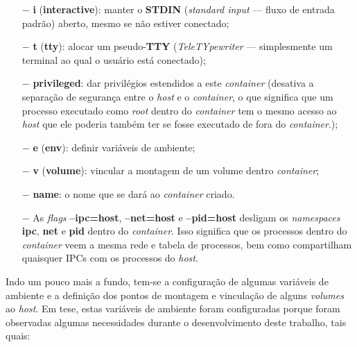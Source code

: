 \documentclass[
  12pt,				%
  openright,			%
  twoside,			%
  a4paper,			%
  english,			%
  french,				%
  spanish,			%
  brazil,				%
  ]{abntex2}
\begin{document}
\begin{itemize}
  \item[$-$] \textbf{i} (\textbf{interactive}): manter o \textbf{STDIN} (\textit{standard input} — fluxo de entrada padrão) aberto, mesmo se não estiver conectado;
  \item[$-$] \textbf{t} (\textbf{tty}): alocar um pseudo-\textbf{TTY} (\textit{TeleTYpewriter} — simplesmente um terminal ao qual o usuário está conectado);
  \item[$-$] \textbf{privileged}: dar privilégios estendidos a este \textit{container} (desativa a separação de segurança entre o \textit{host} e o
        \textit{container}, o que significa que um processo executado como \textit{root} dentro do \textit{container} tem o mesmo acesso ao \textit{host}
        que ele poderia também ter se fosse executado de fora do \textit{container}.);
  \item[$-$] \textbf{e} (\textbf{env}): definir variáveis de ambiente;
  \item[$-$] \textbf{v} (\textbf{volume}): vincular a montagem de um volume dentro \textit{container};
  \item[$-$] \textbf{name}: o nome que se dará ao \textit{container} criado.
  \item[$-$] As \textit{flags} \textbf{--ipc=host}, \textbf{--net=host} e \textbf{--pid=host} desligam os \textit{namespaces} \textbf{ipc},
        \textbf{net} e \textbf{pid} dentro do \textit{container}. Isso significa que os processos dentro do \textit{container} veem a mesma rede e
        tabela de processos, bem como compartilham quaisquer IPCs com os processos do \textit{host}.
\end{itemize}

Indo um pouco mais a fundo, tem-se a configuração de algumas variáveis de ambiente e a definição dos pontos de montagem e vinculação de alguns
\textit{volumes} ao \textit{host}. Em tese, estas variáveis de ambiente foram configuradas porque foram observadas algumas necessidades durante o
desenvolvimento deste trabalho, tais quais:
\end{document}
